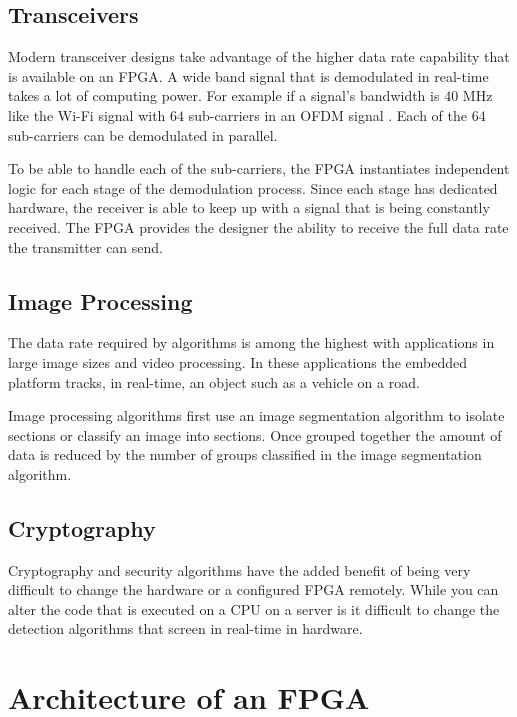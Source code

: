 \subsection{Transceivers}
	
Modern transceiver designs take advantage of the higher data rate capability that is available on an \ac{FPGA}. A wide band signal that is demodulated in real-time takes a lot of computing power. For example if a signal's bandwidth is $40$ \ac{MHz} like the Wi-Fi signal with $64$ sub-carriers in an \ac{OFDM} signal \cite{wifistd}. Each of the $64$ sub-carriers can be demodulated in parallel. 

To be able to handle each of the sub-carriers, the \ac{FPGA} instantiates independent logic for each stage of the demodulation process. Since each stage has dedicated hardware, the receiver is able to keep up with a signal that is being constantly received. The \ac{FPGA} provides the designer the ability to receive the full data rate the transmitter can send. 	
	
\subsection{Image Processing}
	
The data rate required by  algorithms is among the highest with applications in large image sizes and video processing. In these applications the embedded platform tracks, in real-time, an object such as a vehicle on a road. 

Image processing algorithms first use an image segmentation algorithm to isolate sections or classify an image into sections. Once grouped together the amount of data is reduced by the number of groups classified in the image segmentation algorithm.

\subsection{Cryptography}

Cryptography and security algorithms have the added benefit of being very difficult to change the hardware or a configured \ac{FPGA} remotely. While you can alter the code that is executed on a \ac{CPU} on a server is it difficult to change the detection algorithms that screen in real-time in hardware. 

\section{Architecture of an FPGA}

